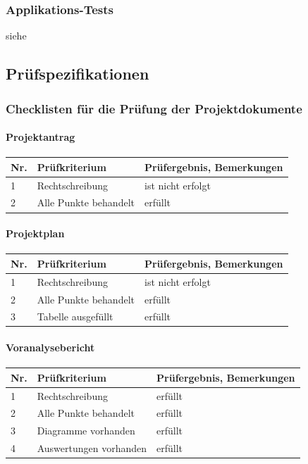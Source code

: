 \documentclass[10pt,paper=a4,final]{scrartcl}
\begin{document}
\subsubsection{Applikations-Tests}
siehe \cite[4. Systemtests]{realisierung} 
\subsection{Pr\"ufspezifikationen}
\subsubsection{Checklisten für die Prüfung der Projektdokumente}
\paragraph{Projektantrag}
\begin{tabularx}{\textwidth}{|l|X|X|}
  \hline
  {{\bf Nr.}}\cellcolor{blue!20!} & {\bf Pr\"ufkriterium}\cellcolor{blue!20!} & {\bf Pr\"ufergebnis, Bemerkungen}\cellcolor{blue!20!} \\ \hline
  1 & Rechtschreibung & ist nicht erfolgt \\ \hline
  2 & Alle Punkte behandelt & erf\"ullt \\ \hline
\end{tabularx}
\paragraph{Projektplan}
\begin{tabularx}{\textwidth}{|l|X|X|}
  \hline
  {{\bf Nr.}}\cellcolor{blue!20!} & {\bf Pr\"ufkriterium}\cellcolor{blue!20!} & {\bf Pr\"ufergebnis, Bemerkungen}\cellcolor{blue!20!} \\ \hline
  1 & Rechtschreibung & ist nicht erfolgt \\ \hline
  2 & Alle Punkte behandelt & erf\"ullt \\ \hline
  3 & Tabelle ausgef\"ullt & erf\"ullt \\ \hline
\end{tabularx}
\paragraph{Voranalysebericht}
\begin{tabularx}{\textwidth}{|l|X|X|}
  \hline
  {{\bf Nr.}}\cellcolor{blue!20!} & {\bf Pr\"ufkriterium}\cellcolor{blue!20!} & {\bf Pr\"ufergebnis, Bemerkungen}\cellcolor{blue!20!} \\ \hline
  1 & Rechtschreibung & erf\"ullt \\ \hline
  2 & Alle Punkte behandelt & erf\"ullt \\ \hline
  3 & Diagramme vorhanden & erf\"ullt \\ \hline
  4 & Auswertungen vorhanden & erf\"ullt \\ \hline
\end{tabularx}
\end{document}

